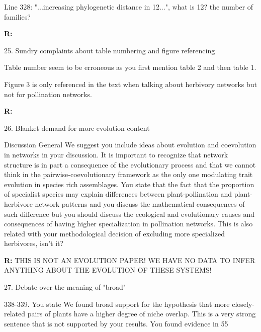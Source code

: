 \documentclass[12pt]{letter}
\newenvironment{refquote}{\bigskip \begin{it}}{\end{it}\smallskip}
\begin{document}
		\begin{refquote}
			Line  328: "...increasing phylogenetic distance in 12...", what is 12? the number of families?
		\end{refquote}

		\textbf{R:}


	25. Sundry complaints about table numbering and figure referencing

		\begin{refquote}
			Table number seem to be erroneous as you first mention table 2 and then table 1.

			\smallskip

			Figure 3 is only referenced in the text when talking about herbivory networks but not for pollination networks.
		\end{refquote}

		\textbf{R:}


	26. Blanket demand for more evolution content

		\begin{refquote}
			Discussion
			General
			We suggest you include ideas about evolution and coevolution in networks in your discussion. It is important to recognize that network structure is in part a consequence of the evolutionary process and that we cannot think in the pairwise-coevolutionary framework as the only one modulating trait evolution in species rich assemblages.
			You state that the fact that the proportion of specialist species may explain differences between plant-pollination and plant-herbivore network patterns and you discuss the mathematical consequences of such difference but you should discuss the ecological and evolutionary causes and consequences of having higher specialization in pollination networks. This is also related with your methodological decision of excluding more specialized herbivores, isn't it?
		\end{refquote}

		\textbf{R:} THIS IS NOT AN EVOLUTION PAPER! WE HAVE NO DATA TO INFER ANYTHING ABOUT THE EVOLUTION OF THESE SYSTEMS!


	27. Debate over the meaning of "broad"

		\begin{refquote}
			338-339. You state We found broad support for the hypothesis that more closely-related pairs of plants have a higher degree of niche overlap. This is a very strong sentence that is not supported by your results. You found evidence in 55%
		\end{refquote}
\end{document}
